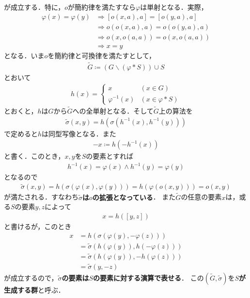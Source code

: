 	が成立する．特に，$o$が簡約律を満たすなら$\varphi$は単射となる．実際，
	\begin{align}
		\varphi(x) = \varphi(y)
		&\Longrightarrow [o(x,a),a] = [o(y,a),a] \\
		&\Longrightarrow o(o(x,a),a) = o(o(y,a),a) \\
		&\Longrightarrow o(x,o(a,a)) = o(x,o(a,a)) \\
		&\Longrightarrow x = y
	\end{align}
	となる．いま$o$を簡約律と可換律を満たすとして，
	\begin{align}
		\tilde{G} \coloneqq \left( G \backslash (\varphi \ast S) \right) \cup S
	\end{align}
	とおいて
	\begin{align}
		h(x) = 
		\begin{cases}
			x & (x \in G) \\
			\varphi^{-1}(x) & (x \in \varphi \ast S)
		\end{cases}
	\end{align}
	とおくと，$h$は$G$から$\tilde{G}$への全単射となる．そして$\tilde{G}$上の算法を
	\begin{align}
		\tilde{\sigma}(x,y) = h\left(\sigma\left(h^{-1}(x),h^{-1}(y)\right)\right)
	\end{align}
	で定めると$h$は同型写像となる．また
	\begin{align}
		-x \coloneqq h\left( -h^{-1}(x) \right)
	\end{align}
	と書く．このとき，$x,y$を$S$の要素とすれば
	\begin{align}
		h^{-1}(x) = \varphi(x) \wedge h^{-1}(y) = \varphi(y)
	\end{align}
	となるので
	\begin{align}
		\tilde{\sigma}(x,y) = h\left(\sigma\left(\varphi(x),\varphi(y)\right)\right)
		= h\left(\varphi(o(x,y))\right)
		= o(x,y)
	\end{align}
	が満たされる．すなわち{\bf $\tilde{\sigma}$は$o$の拡張となっている}．
	また$\tilde{G}$の任意の要素$x$は，或る$S$の要素$y,z$によって
	\begin{align}
		x = h([y,z])
	\end{align}
	と書けるが，このとき
	\begin{align}
		x &= h\left(\sigma(\varphi(y),-\varphi(z))\right) \\
		&= \tilde{\sigma} \left(h(\varphi(y)),h(-\varphi(z))\right) \\
		&= \tilde{\sigma} \left(h(\varphi(y)),-h(\varphi(z))\right) \\
		&= \tilde{\sigma}(y,-z)
	\end{align}
	が成立するので，{\bf $\tilde{\sigma}$の要素は$S$の要素に対する演算で表せる}．
	この$(\tilde{G},\tilde{\sigma})$を{\bf $S$が生成する群}と呼ぶ．
	
\newpage